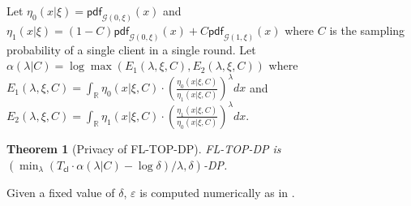 \documentclass[accepted]{uai2021} %
\newtheorem{theorem}{Theorem}
\begin{document}
Let $\eta_0(x|\xi) =  \mathsf{pdf}_{\mathcal{G}(0, \xi)}(x)$ and $\eta_1(x|\xi) =  (1-C) \mathsf{pdf}_{\mathcal{G}(0, \xi)}(x) + C \mathsf{pdf}_{\mathcal{G}(1, \xi)}(x)$ where $C$ is the sampling probability of a single client in a single round. Let
$
\alpha(\lambda| C) = \log\max(E_1(\lambda, \xi, C), E_2(\lambda, \xi, C)) 
$
where
$%
E_1(\lambda,  \xi, C) =  \int_{\mathbb{R}}\eta_0(x|\xi, C) \cdot \left(\frac{\eta_0(x|\xi, C)}{\eta_1(x|\xi, C)}\right)^{\lambda} dx
$ and
$ E_2(\lambda,  \xi, C) = \int_{\mathbb{R}}\eta_1(x|\xi, C) \cdot \left(\frac{\eta_1(x|\xi, C)}{\eta_0(x|\xi, C)}\right)^{\lambda} dx
$.

\begin{theorem}[Privacy of FL-TOP-DP]
\label{thm:dg_privacy}
FL-TOP-DP is $(\min_\lambda  (T_{\mathsf{cl}}\cdot \alpha (\lambda | C)  - \log \delta) /\lambda, \delta)$-DP. 
\end{theorem}
Given a fixed value of $\delta$, $\varepsilon$ is computed numerically  as in \cite{Abadi,MironovTZ19}.



\end{document}
